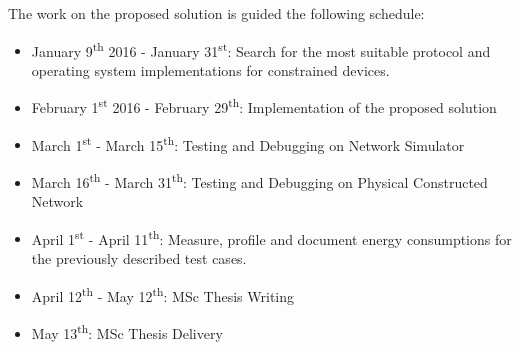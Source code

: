 The work on the proposed solution is guided the following schedule:

\begin{itemize}
	\item January 9\textsuperscript{th} 2016 - January 31\textsuperscript{st}: Search for the most suitable protocol and operating system implementations for constrained devices.
	\item February 1\textsuperscript{st} 2016 - February 29\textsuperscript{th}: Implementation of the proposed solution
	\item March 1\textsuperscript{st} - March 15\textsuperscript{th}: Testing and Debugging on Network Simulator
	\item March 16\textsuperscript{th} - March 31\textsuperscript{th}: Testing and Debugging on Physical Constructed Network
	\item April 1\textsuperscript{st} - April 11\textsuperscript{th}: Measure, profile and document energy consumptions for the previously described test cases.
	\item April 12\textsuperscript{th} - May 12\textsuperscript{th}: MSc Thesis Writing
	\item May 13\textsuperscript{th}: MSc Thesis Delivery
\end{itemize}